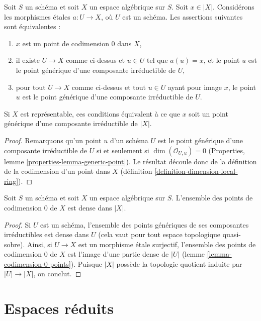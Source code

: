 \begin{lemma}
\label{lemma-codimension-0-points}
Soit $S$ un schéma et soit $X$ un espace algébrique sur $S$.
Soit $x \in |X|$. Considérons les morphismes \'etales $a : U \to X$, où
$U$ est un schéma. Les assertions suivantes sont équivalentes :
\begin{enumerate}
\item $x$ est un point de codimension $0$ dans $X$,
\item il existe $U \to X$ comme ci-dessus et $u \in U$ tel que $a(u) = x$,
et le point $u$ est le point générique d'une composante irréductible de $U$,
\item pour tout $U \to X$ comme ci-dessus et tout $u \in U$ ayant pour image $x$,
le point $u$ est le point générique d'une composante irréductible de $U$.
\end{enumerate}
Si $X$ est représentable, ces conditions équivalent à ce que $x$ soit un point générique
d'une composante irréductible de $|X|$.
\end{lemma}

\begin{proof}
Remarquons qu'un point $u$ d'un schéma $U$ est le point générique d'une
composante irréductible de $U$ si et seulement si $\dim(\mathcal{O}_{U, u}) = 0$
(Properties, lemme \ref{properties-lemma-generic-point}).
Le résultat découle donc de la définition de la codimension d'un
point dans $X$ (définition \ref{definition-dimension-local-ring}).
\end{proof}

\begin{lemma}
\label{lemma-codimension-0-points-dense}
Soit $S$ un schéma et soit $X$ un espace algébrique sur $S$.
L'ensemble des points de codimension $0$ de $X$ est dense dans $|X|$.
\end{lemma}

\begin{proof}
Si $U$ est un schéma, l'ensemble des points génériques de ses composantes
irréductibles est dense dans $U$ (cela vaut pour tout espace topologique quasi-sobre).
Ainsi, si $U \to X$ est un morphisme \'etale surjectif, l'ensemble
des points de codimension $0$ de $X$ est l'image d'une partie dense de
$|U|$ (lemme \ref{lemma-codimension-0-points}). Puisque $|X|$ possède la
topologie quotient induite par $|U| \to |X|$, on conclut.
\end{proof}





\section{Espaces réduits}
\label{section-reduced}

